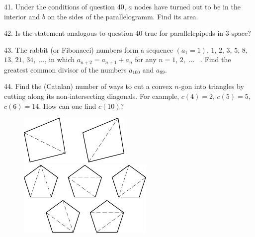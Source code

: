 \begin{problem}{41.}
	Under the conditions of question 40, $a$ nodes have turned out to be in the interior and $b$ on the sides of the parallelogramm. Find its area. 
\end{problem}

\begin{problem}{42.}
	Is the statement analogous to question 40 true for parallelepipeds in 3-space?
\end{problem}

\begin{problem}{43.}
	The rabbit (or Fibonacci) numbers form a sequence $(a_1=1)$, $1$, $2$, $3$, $5$, $8$, $13$, $21$,
	$34$,\nobreak\ $\dots$, in which $a_{n+2}=a_{n+1}+a_n$ for any
	$n=1$, $2$,\nobreak\ $\dots$ \  . Find the greatest common divisor of the numbers $a_{100}$ and $a_{99}$.
\end{problem}

\begin{problem}{44.}
	Find the (Catalan) number of ways to cut a convex $n$-gon into triangles by cutting along its non-intersecting diagonals. 
	For example, $c(4)=2$, $c(5)=5$, $c(6)=14$. How can one find $c(10)$?
	\begin{figure}[h]
	\centering
	\includegraphics[scale=1]{taskbook-281}
	\hskip1cm\includegraphics[scale=1]{taskbook-282}
	\end{figure}
\end{problem}

